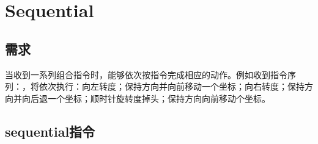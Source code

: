 \begin{savequote}[45mm]  
\end{savequote}

\chapter{Sequential} 
\label{ch:sequential}

\section{需求}

\begin{content}

当收到一系列组合指令时，能够依次按指令完成相应的动作。例如收到指令序列：，将依次执行：向左转度；保持方向并向前移动一个坐标；向右转度；保持方向并向后退一个坐标；顺时针旋转度掉头；保持方向向前移动个坐标。

\end{content}

\section{sequential指令}

